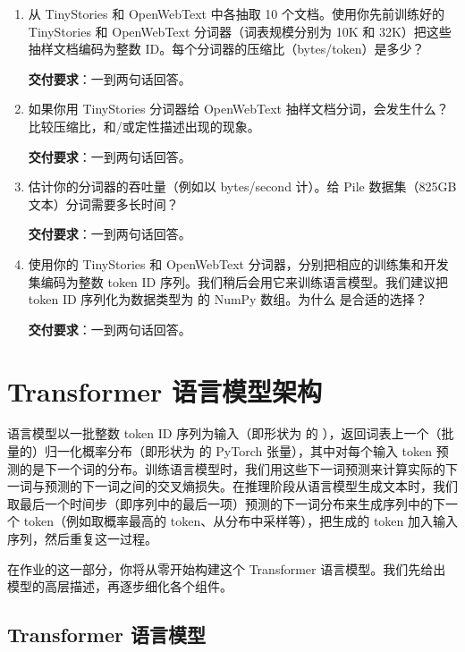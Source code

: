 \begin{enumerate}[label=(\alph*)]
  \item 从 TinyStories 和 OpenWebText 中各抽取 10 个文档。使用你先前训练好的 TinyStories 和 OpenWebText 分词器（词表规模分别为 10K 和 32K）把这些抽样文档编码为整数 ID。每个分词器的压缩比（bytes/token）是多少？

        \textbf{交付要求}：一到两句话回答。

  \item 如果你用 TinyStories 分词器给 OpenWebText 抽样文档分词，会发生什么？比较压缩比，和/或定性描述出现的现象。

        \textbf{交付要求}：一到两句话回答。

  \item 估计你的分词器的吞吐量（例如以 bytes/second 计）。给 Pile 数据集（825GB 文本）分词需要多长时间？

        \textbf{交付要求}：一到两句话回答。

  \item 使用你的 TinyStories 和 OpenWebText 分词器，分别把相应的训练集和开发集编码为整数 token ID 序列。我们稍后会用它来训练语言模型。我们建议把 token ID 序列化为数据类型为  的 NumPy 数组。为什么  是合适的选择？

        \textbf{交付要求}：一到两句话回答。
\end{enumerate}

\section{Transformer 语言模型架构}

语言模型以一批整数 token ID 序列为输入（即形状为  的 ），返回词表上一个（批量的）归一化概率分布（即形状为  的 PyTorch 张量），其中对每个输入 token 预测的是下一个词的分布。训练语言模型时，我们用这些下一词预测来计算实际的下一词与预测的下一词之间的交叉熵损失。在推理阶段从语言模型生成文本时，我们取最后一个时间步（即序列中的最后一项）预测的下一词分布来生成序列中的下一个 token（例如取概率最高的 token、从分布中采样等），把生成的 token 加入输入序列，然后重复这一过程。

在作业的这一部分，你将从零开始构建这个 Transformer 语言模型。我们先给出模型的高层描述，再逐步细化各个组件。

\subsection{Transformer 语言模型}

